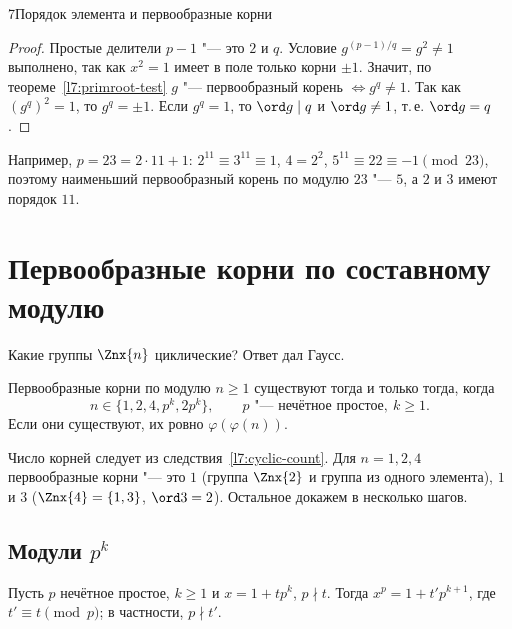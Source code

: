 \begin{lecture}{7}{Порядок элемента и первообразные корни}
\begin{proof}
Простые делители $p - 1$ "--- это $2$ и $q$. Условие $g^{(p-1)/q} = g^2 \ne 1$ выполнено, так
как $x^2 = 1$ имеет в поле только корни $\pm 1$. Значит, по теореме~\ref{l7:primroot-test}
$g$ "--- первообразный корень $\iff g^q \ne 1$. Так как $(g^q)^2 = 1$, то $g^q = \pm 1$. Если
$g^q = 1$, то $\ord g \mid q$ и $\ord g \ne 1$, т.\,е. $\ord g = q$.
\end{proof}

Например, $p = 23 = 2 \cdot 11 + 1$: $2^{11} \equiv 3^{11} \equiv 1$, $4 = 2^2$, $5^{11}
\equiv 22 \equiv -1 \pmod{23}$, поэтому наименьший первообразный корень по модулю $23$ "---
$5$, а $2$ и $3$ имеют порядок $11$.



\section{Первообразные корни по составному модулю}

Какие группы $\Znx{n}$ циклические? Ответ дал Гаусс.

\begin{theorem}[Гаусс]\label{l7:gauss}
Первообразные корни по модулю $n \ge 1$ существуют тогда и только тогда, когда
\[
  n \in \{1, 2, 4, p^k, 2p^k\}, \qquad p \text{ "--- нечётное простое}, \ k \ge 1.
\]
Если они существуют, их ровно $\varphi(\varphi(n))$.
\end{theorem}

Число корней следует из следствия~\ref{l7:cyclic-count}. Для $n = 1, 2, 4$ первообразные корни
"--- это $1$ (группа $\Znx{2}$ и группа из одного элемента), $1$ и $3$ ($\Znx{4} = \{1, 3\}$,
$\ord 3 = 2$). Остальное докажем в несколько шагов.

\subsection{Модули \texorpdfstring{$p^k$}{p\^{}k}}

\begin{lemma}\label{l7:lift-step}
Пусть $p$ нечётное простое, $k \ge 1$ и $x = 1 + t p^k$, $p \nmid t$. Тогда
$x^p = 1 + t' p^{k+1}$, где $t' \equiv t \pmod p$; в частности, $p \nmid t'$.
\end{lemma}


\end{lecture}
